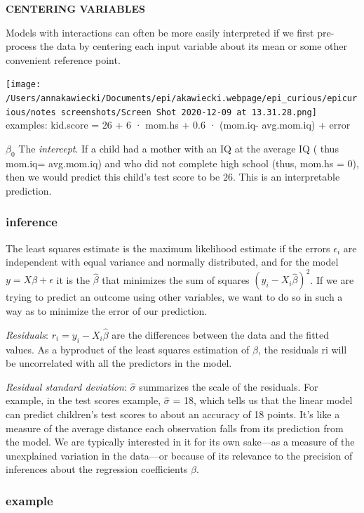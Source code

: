 \documentclass[
]{article}
\begin{document}
\textbf{CENTERING VARIABLES}

Models with interactions can often be more easily interpreted if we
first pre-process the data by centering each input variable about its
mean or some other convenient reference point.

\texttt{[image: /Users/annakawiecki/Documents/epi/akawiecki.webpage/epi\_curious/epicurious/notes screenshots/Screen Shot 2020-12-09 at 13.31.28.png]}
examples: kid.score = 26 + 6 · mom.hs + 0.6 · (mom.iq- avg.mom.iq) +
error

\(\beta_0\) The \emph{intercept}. If a child had a mother with an IQ at
the average IQ ( thus mom.iq= avg.mom.iq) and who did not complete high
school (thus, mom.hs = 0), then we would predict this child's test score
to be 26. This is an interpretable prediction.

\hypertarget{inference}{%
\subsubsection{inference}\label{inference}}

The least squares estimate is the maximum likelihood estimate if the
errors \(\epsilon_i\) are independent with equal variance and normally
distributed, and for the model \(y=X\beta+\epsilon\) it is the
\(\hat{\beta}\) that minimizes the sum of squares
\((y_i- X_i\hat{\beta})^{2}\). If we are trying to predict an outcome
using other variables, we want to do so in such a way as to minimize the
error of our prediction.

\emph{Residuals}: \(r_i= y_i- X_i\hat{\beta}\) are the differences
between the data and the fitted values. As a byproduct of the least
squares estimation of \(\beta\), the residuals ri will be uncorrelated
with all the predictors in the model.

\emph{Residual standard deviation}: \(\hat{\sigma}\) summarizes the
scale of the residuals. For example, in the test scores example,
\(\hat{\sigma}\) = 18, which tells us that the linear model can predict
children's test scores to about an accuracy of 18 points. It's like a
measure of the average distance each observation falls from its
prediction from the model. We are typically interested in it for its own
sake---as a measure of the unexplained variation in the data---or
because of its relevance to the precision of inferences about the
regression coefficients \(\beta\).

\hypertarget{example}{%
\subsubsection{example}\label{example}}
\end{document}
